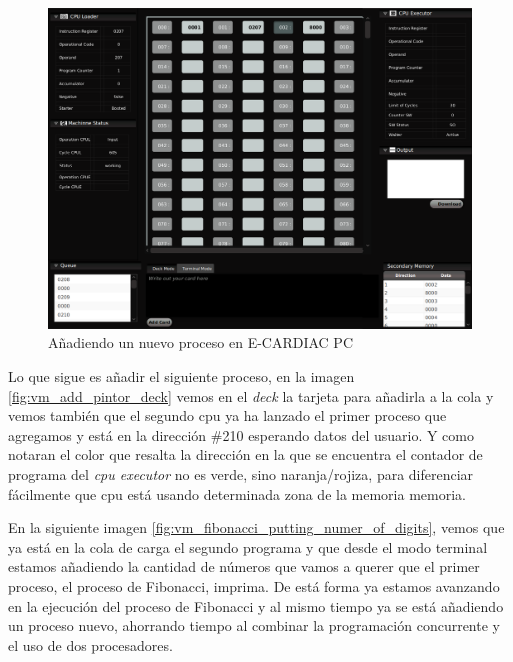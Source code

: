 \documentclass[letterpaper,12pt,oneside]{book}
\begin{document}
			
			\begin{figure}[H]		
				\centering
				\includegraphics[scale=0.35]{media/Paralela/vm_adding_new_process_fibonacci_cut.png}
				\caption{Añadiendo un nuevo proceso en E-CARDIAC PC}
				\label{fig:vm_adding_new_process_fibonacci}
			\end{figure}			
			
			
			
			
		
			Lo que sigue es añadir el siguiente proceso, en la imagen \ref{fig:vm_add_pintor_deck} vemos en el \textit{deck} la
			tarjeta para añadirla a la cola y vemos también que el segundo cpu ya ha lanzado el primer proceso que agregamos
			y está en la dirección \#210 esperando datos del usuario. Y como notaran el color que resalta la dirección en la
			que se encuentra el contador de programa del \textit{cpu executor} no es verde, sino naranja/rojiza, para diferenciar 
			fácilmente que cpu está usando determinada zona de la memoria memoria.
		 	
			
			
			En la siguiente imagen \ref{fig:vm_fibonacci_putting_numer_of_digits}, vemos que ya está en la cola de carga
			el segundo programa y que desde el modo terminal estamos añadiendo la cantidad de números que vamos a querer que
			el primer proceso, el proceso de Fibonacci, imprima. De está forma ya estamos avanzando en la ejecución del proceso de Fibonacci
			y al mismo tiempo ya se está añadiendo un proceso nuevo, ahorrando tiempo al combinar la programación concurrente y el uso
			de dos procesadores.
			
\end{document}
